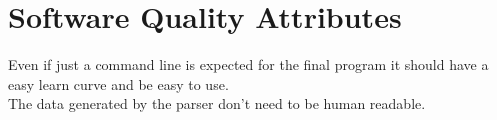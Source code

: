 \documentclass{scrreprt}
\begin{document}
\section{Software Quality Attributes}
Even if just a command line is expected for the final program it should have a
easy learn curve and be easy to use.\\
The data generated by the parser don't need to be human readable.\\





\end{document}
